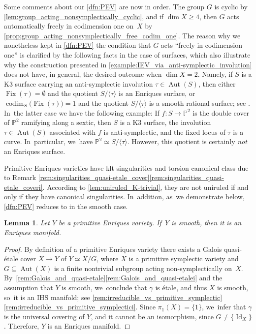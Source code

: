 \documentclass[JEP,XML,SOM,Unicode,published]{cedram}
\theoremstyle{plain}
\newtheorem{lem}[thm]{Lemma}
\theoremstyle{definition}
\renewcommand{\P}{\mathbb{P}}
\DeclareMathOperator{\codim}{codim}
\DeclareMathOperator{\Id}{Id}
\DeclareMathOperator{\Aut}{Aut}
\DeclareMathOperator{\Fix}{Fix}
\begin{document}
Some comments about our \autoref{dfn:PEV} are now in order. The group $G$ is cyclic by \autoref{lem:group_acting_nonsymplectically_cyclic}, and if $\dim X \geq 4$, then $G$ acts automatically freely in codimension one on~$X$ by \autoref{prop:group_acting_nonsymplectically_free_codim_one}.
The reason why we nonetheless kept in \autoref{dfn:PEV} the condition that $G$ acts \enquote{freely in codimension one}
is clarified by the following facts in the case of surfaces, which also illustrate why the construction presented in \autoref{example:IEV_via_anti-symplectic_involution} does not have, in general, the desired outcome when $\dim X = 2$. Namely, if $S$ is a K3 surface carrying an anti-symplectic involution $\tau \in \Aut(S)$, then either $\Fix(\tau) = \emptyset$ and the quotient $S / \langle \tau \rangle$ is an Enriques surface, or $\codim_S \bigl(\Fix(\tau) \bigr) = 1$ and the quotient $S / \langle \tau \rangle$ is a smooth rational surface; see \cite[\S 3]{AST11}. In~the latter case we have the following example:
If $f \colon S \to \P^2$ is the double cover of $\P^2$ ramifying along a sextic, then $S$ is a K3 surface, the involution $\tau \in \Aut(S)$ associated with $f$ is anti-symplectic, and the fixed locus of $\tau$ is a curve. In~particular, we~have $\P^2 \simeq S / \langle \tau \rangle$. However, this quotient is certainly \emph{not} an Enriques surface.

Primitive Enriques varieties have klt singularities and torsion canonical class due to Remark \ref{rem:singularities_quasi-etale_cover}\eqref{rem:singularities_quasi-etale_coveri}. According to \autoref{lem:uniruled_K-trivial}, they are not uniruled if and only if they have canonical singularities. In~addition, as~we demonstrate below, \autoref{dfn:PEV} reduces to \cite[Def.\,2.1]{OS11a} in the smooth case.

\begin{lem}
\label{lem:smooth_PEV}
Let $Y$ be a primitive Enriques variety. If~$Y$ is smooth, then it is an Enriques manifold.
\end{lem}

\begin{proof}
By definition of a primitive Enriques variety there exists a Galois quasi-étale cover $X \to Y$ of $Y \simeq X / G$, where $X$ is a primitive symplectic variety and $G \subseteq \Aut(X)$ is a finite nontrivial subgroup acting non-symplectically on~$X$. By~\autoref{rem:Galois_and_quasi-etale}\eqref{rem:Galois_and_quasi-etalei} and the assumption that $Y$ is smooth, we~conclude that $\gamma$ is étale, and thus $X$ is smooth, so~it is an IHS manifold; see \autoref{rem:irreducible_vs_primitive_symplectic}\eqref{rem:irreducible_vs_primitive_symplectici}. Since $\pi_1(X) = \{ 1 \}$, we~infer that $\gamma$ is the universal covering of $Y$, and it cannot be an isomorphism, since $G \neq \{ \Id_X \}$. Therefore, $Y$ is an Enriques manifold.
\end{proof}
\end{document}
